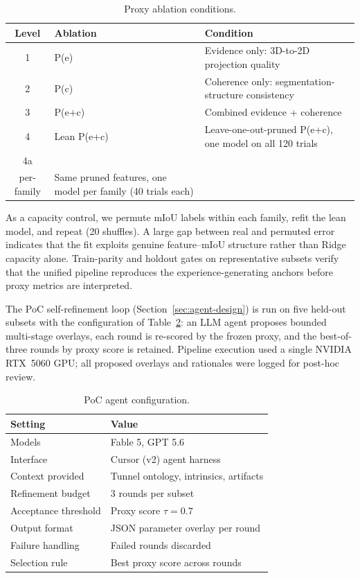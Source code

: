 \documentclass[a4paper,fleqn]{cas-dc}
\begin{document}
\begin{table}[ht]
\caption{Proxy ablation conditions.}\label{tab:proxy-ablation}
\begin{tabular*}{\tblwidth}{@{} c >{\raggedright\arraybackslash}p{2.3cm} >{\raggedright\arraybackslash}p{4.2cm} @{}}
\toprule
Level & Ablation & Condition \\
\midrule
1 & P(e) & Evidence only: 3D-to-2D projection quality \\
2 & P(c) & Coherence only: segmentation-structure consistency \\
3 & P(e+c) & Combined evidence + coherence \\
4 & Lean P(e+c) & Leave-one-out-pruned P(e+c), one model on all 120 trials \\
4a & \begin{tabular}[t]{@{}l@{}}Lean P(e+c) \\ per-family\end{tabular} & Same pruned features, one model per family (40 trials each) \\
\bottomrule
\end{tabular*}
\end{table}

As a capacity control, we permute mIoU labels within each family, refit the lean model, and repeat (20 shuffles). A large gap between real and permuted error indicates that the fit exploits genuine feature--mIoU structure rather than Ridge capacity alone. Train-parity and holdout gates on representative subsets verify that the unified pipeline reproduces the experience-generating anchors before proxy metrics are interpreted.

The PoC self-refinement loop (Section~\ref{sec:agent-design}) is run on five held-out subsets with the configuration of Table~\ref{tab:poc-config}: an LLM agent proposes bounded multi-stage overlays, each round is re-scored by the frozen proxy, and the best-of-three rounds by proxy score is retained. Pipeline execution used a single NVIDIA RTX~5060 GPU; all proposed overlays and rationales were logged for post-hoc review.

\begin{table}[ht]
\caption{PoC agent configuration.}\label{tab:poc-config}
\begin{tabular*}{\tblwidth}{@{} l l @{}}
\toprule
Setting & Value \\
\midrule
Models & Fable 5, GPT 5.6 \\
Interface & Cursor (v2) agent harness \\
Context provided & Tunnel ontology, intrinsics, artifacts \\
Refinement budget & 3 rounds per subset \\
Acceptance threshold & Proxy score $\tau = 0.7$ \\
Output format & JSON parameter overlay per round \\
Failure handling & Failed rounds discarded \\
Selection rule & Best proxy score across rounds \\
\bottomrule
\end{tabular*}
\end{table}
\end{document}
